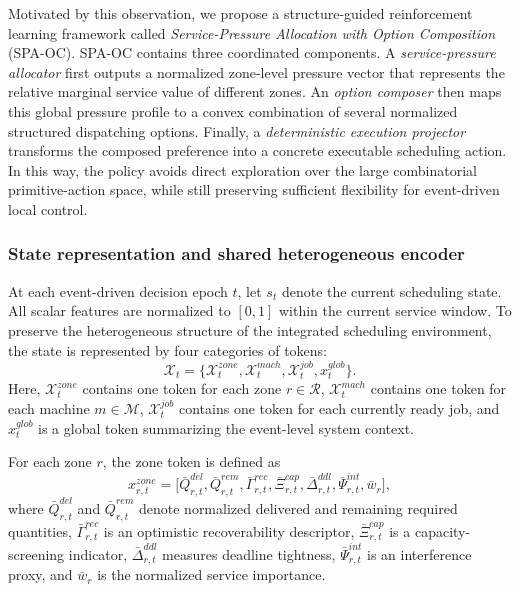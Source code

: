 \documentclass[a4paper,fleqn]{cas-sc}
\begin{document}
Motivated by this observation, we propose a structure-guided reinforcement learning framework called \emph{Service-Pressure Allocation with Option Composition} (SPA-OC). SPA-OC contains three coordinated components. A \emph{service-pressure allocator} first outputs a normalized zone-level pressure vector that represents the relative marginal service value of different zones. An \emph{option composer} then maps this global pressure profile to a convex combination of several normalized structured dispatching options. Finally, a \emph{deterministic execution projector} transforms the composed preference into a concrete executable scheduling action. In this way, the policy avoids direct exploration over the large combinatorial primitive-action space, while still preserving sufficient flexibility for event-driven local control.

\subsubsection{State representation and shared heterogeneous encoder}

At each event-driven decision epoch $t$, let $s_t$ denote the current scheduling state. All scalar features are normalized to $[0,1]$ within the current service window. To preserve the heterogeneous structure of the integrated scheduling environment, the state is represented by four categories of tokens:
\begin{equation}
\mathcal{X}_t=\{\mathcal{X}_t^{zone},\mathcal{X}_t^{mach},\mathcal{X}_t^{job},x_t^{glob}\}.
\label{eq:spa_tokens}
\end{equation}
Here, $\mathcal{X}_t^{zone}$ contains one token for each zone $r\in\mathcal{R}$, $\mathcal{X}_t^{mach}$ contains one token for each machine $m\in\mathcal{M}$, $\mathcal{X}_t^{job}$ contains one token for each currently ready job, and $x_t^{glob}$ is a global token summarizing the event-level system context.

For each zone $r$, the zone token is defined as
\begin{equation}
x_{r,t}^{zone}=
\big[
\bar Q_{r,t}^{del},
\bar Q_{r,t}^{rem},
\bar \Gamma_{r,t}^{rec},
\bar \Xi_{r,t}^{cap},
\bar \Delta_{r,t}^{ddl},
\bar \Psi_{r,t}^{int},
\bar w_r
\big],
\label{eq:zone_token}
\end{equation}
where $\bar Q_{r,t}^{del}$ and $\bar Q_{r,t}^{rem}$ denote normalized delivered and remaining required quantities, $\bar \Gamma_{r,t}^{rec}$ is an optimistic recoverability descriptor, $\bar \Xi_{r,t}^{cap}$ is a capacity-screening indicator, $\bar \Delta_{r,t}^{ddl}$ measures deadline tightness, $\bar \Psi_{r,t}^{int}$ is an interference proxy, and $\bar w_r$ is the normalized service importance.
\end{document}
